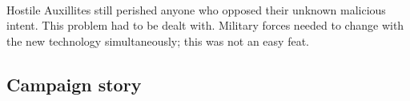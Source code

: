 \documentclass[../Main.tex]{subfiles}
\begin{document}
\paragraph{}
Hostile Auxillites still perished anyone who opposed their unknown malicious intent. This problem had to be dealt with. Military forces needed to change with the new technology simultaneously; this was not an easy feat. 

\subsection{Campaign story}
\end{document}
